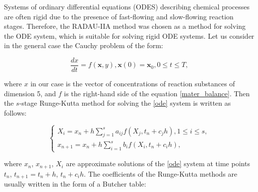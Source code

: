 \documentclass{svproc}
\begin{document}

Systems of ordinary differential equations (ODES) describing chemical processes are often rigid due to the presence of fast-flowing and slow-flowing reaction stages. Therefore, the RADAU-IIA method was chosen as a method for solving the ODE system, which is suitable for solving rigid ODE systems. Let us consider in the general case the Cauchy problem of the form:

\begin{equation}\label{ode}
\dfrac{dx}{dt} = f(\textbf{x}, y), \textbf{x}(0) = \textbf{x}_0, 0 \le t \le T,
\end{equation}


where $x$ in our case is the vector of concentrations of reaction substances of dimension 5, and $f$ is the right-hand side of the equation \eqref{mater_balance}. Then the $s$-stage Runge-Kutta method for solving the \eqref{ode} system is written as follows:

\begin{equation}\label{runge}
\begin{cases}
X_i = x_n + h \sum\limits_{j=1}^s a_{ij} f(X_j, t_n + c_j h) , 1 \le i \le s, 
\\
x_{n+1} = x_n + h \sum\limits_{i=1}^s b_i f (X_i, t_n + c_i h),
\end{cases}
\end{equation}


where $x_n$, $x_{n+1}$, $X_i$ are approximate solutions of the \eqref{ode} system at time points $t_n$, $t_{n+1} = t_n + h$, $t_n + c_i h$. The coefficients of the Runge-Kutta methods are usually written in the form of a Butcher table:
\end{document}
